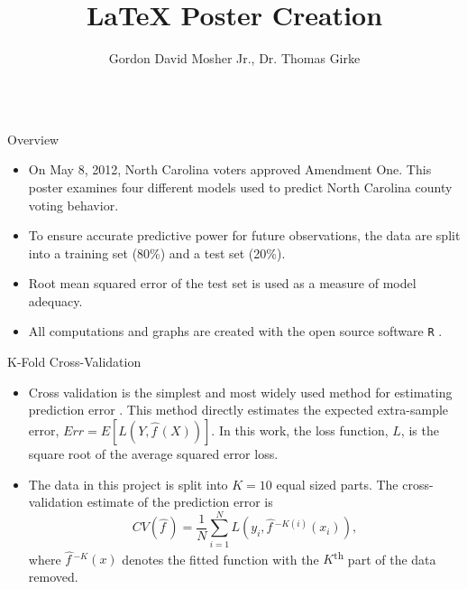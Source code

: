 \documentclass[final]{beamer}
\title{LaTeX Poster Creation}
\author{Gordon David Mosher Jr., Dr. Thomas Girke}
\institute{University of California, Riverside - Institute of Integrative Genome Biology  - Bioinformatics}
\begin{document}

\begin{frame}[fragile]
\vspace{-2ex}
\begin{columns}[t]


\begin{column}{0.31\linewidth}
\begin{minipage}[t][.955\textheight]{\linewidth} 

\vspace{0ex}
\begin{block}{Overview}
\begin{itemize}
\item On May 8, 2012, North Carolina voters approved Amendment One.  This poster examines four different models used to predict North Carolina county voting behavior.  
\item To ensure accurate predictive power for future observations, the data are split into a training set (80\%) and a test set (20\%). 
\item Root mean squared error of the test set is used as a measure of model adequacy.  
\item All computations and graphs are created with the open source software \texttt{R} \cite{R-base}. 
\end{itemize}
\vspace{0ex}
\end{block}
\vfill

\begin{block}{K-Fold Cross-Validation}
\begin{itemize}
\item Cross validation is the simplest and most widely used method for estimating prediction error \cite{JF09}.  This method directly estimates the expected extra-sample error, $Err = E[{L(Y, \hat{f\,}\!(X))}]$.  In this work, the loss function, $L$, is the square root of the average squared error loss.
\vspace{2ex}
\item The data in this project is split into $K=10$ equal sized parts.  The cross-validation estimate of the prediction error is $$CV(\hat{f\,}\!)=\frac{1}{N}\sum_{i=1}^{N}L(y_i, \hat{f\,}\!^{-K(i)}(x_i)),$$
where $\hat{f\,}\!^{-K}(x)$ denotes the fitted function with the $K$\textsuperscript{th} part of the data removed.
\end{itemize}
\vspace{0ex}
\vfill
\end{block}
\vfill


\end{minipage}
\end{column}
\end{columns}
\end{frame}
\end{document}
